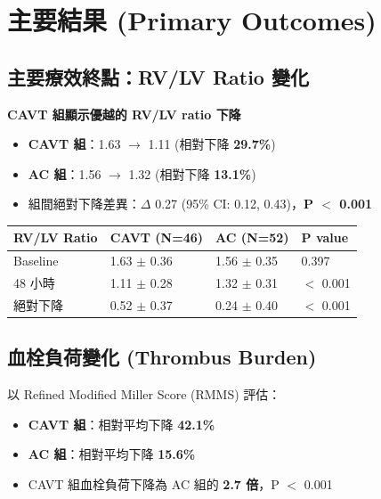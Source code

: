 \documentclass[11pt,a4paper]{article}
\begin{document}
\section{主要結果 (Primary Outcomes)}

\subsection{主要療效終點：RV/LV Ratio 變化}

\begin{importantbox}
\textbf{CAVT 組顯示優越的 RV/LV ratio 下降}
\begin{itemize}[leftmargin=*,itemsep=2pt]
    \item \textbf{CAVT 組}：1.63 $\rightarrow$ 1.11 (相對下降 \textbf{29.7\%})
    \item \textbf{AC 組}：1.56 $\rightarrow$ 1.32 (相對下降 \textbf{13.1\%})
    \item 組間絕對下降差異：$\Delta$ 0.27 (95\% CI: 0.12, 0.43)，\textbf{P $<$ 0.001}
\end{itemize}
\end{importantbox}

\begin{longtable}{p{4cm}p{3cm}p{3cm}p{3cm}}
\toprule
\textbf{RV/LV Ratio} & \textbf{CAVT (N=46)} & \textbf{AC (N=52)} & \textbf{P value} \\
\midrule
\endfirsthead
\bottomrule
\endfoot
Baseline & 1.63 $\pm$ 0.36 & 1.56 $\pm$ 0.35 & 0.397 \\
\midrule
48 小時 & 1.11 $\pm$ 0.28 & 1.32 $\pm$ 0.31 & $<$ 0.001 \\
\midrule
絕對下降 & 0.52 $\pm$ 0.37 & 0.24 $\pm$ 0.40 & $<$ 0.001 \\
\bottomrule
\end{longtable}

\subsection{血栓負荷變化 (Thrombus Burden)}

以 Refined Modified Miller Score (RMMS) 評估：
\begin{itemize}[leftmargin=*,itemsep=2pt]
    \item \textbf{CAVT 組}：相對平均下降 \textbf{42.1\%}
    \item \textbf{AC 組}：相對平均下降 \textbf{15.6\%}
    \item CAVT 組血栓負荷下降為 AC 組的 \textbf{2.7 倍}，P $<$ 0.001
\end{itemize}
\end{document}
